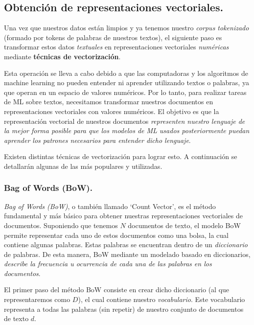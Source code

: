 \documentclass[12pt,a4paper]{article}
\begin{document}
\begin{sloppypar}
\subsection{Obtención de representaciones vectoriales.}\label{rep_vect}

Una vez que nuestros datos están limpios y ya tenemos nuestro \textit{corpus tokenizado} (formado por tokens de palabras de nuestros textos), el siguiente paso es transformar estos datos \textit{textuales} en representaciones vectoriales \textit{numéricas} mediante \textbf{técnicas de vectorización}.

Esta operación se lleva a cabo debido a que las computadoras y los algoritmos de machine learning no pueden entender ni aprender utilizando textos o palabras, ya que operan en un espacio de valores numéricos. Por lo tanto, para realizar tareas de ML sobre textos, necesitamos transformar nuestros documentos en representaciones vectoriales con valores numéricos. El objetivo es que la representación vectorial de nuestros documentos \textit{representen nuestro lenguaje de la mejor forma posible para que los modelos de ML usados posteriormente puedan aprender los patrones necesarios para entender dicho lenguaje}\cite{NLP_7}.

Existen distintas técnicas de vectorización para lograr esto. A continuación se detallarán algunas de las más populares y utilizadas\cite{NLP_2}.

\cleardoublepage

\subsubsection{Bag of Words (BoW).}\label{bow}

\textit{Bag of Words (BoW)}, o también llamado ‘Count Vector’, es el método fundamental y más básico para obtener nuestras representaciones vectoriales de documentos. Suponiendo que tenemos $N$ documentos de texto, el modelo BoW permite representar cada uno de estos documentos como una bolsa, la cual contiene algunas palabras. Estas palabras se encuentran dentro de un \textit{diccionario} de palabras. De esta manera, BoW mediante un modelado basado en diccionarios, \textit{describe la frecuencia u ocurrencia de cada una de las palabras en los documentos}.

El primer paso del método BoW consiste en crear dicho diccionario (al que representaremos como $D$), el cual contiene nuestro \textit{vocabulario}. Este vocabulario representa a todas las palabras (sin repetir) de nuestro conjunto de documentos de texto $d$.


\end{sloppypar}
\end{document}
